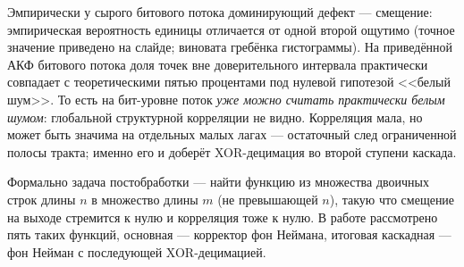 \documentclass[12pt,a4paper]{extarticle}
\begin{document}
Эмпирически у сырого битового потока доминирующий дефект --- смещение:
эмпирическая вероятность единицы отличается от одной второй ощутимо
(точное значение приведено на слайде; виновата гребёнка гистограммы).
На приведённой АКФ битового потока доля точек вне доверительного интервала
практически совпадает с теоретическими пятью процентами под нулевой
гипотезой <<белый шум>>. То есть на бит-уровне поток \emph{уже можно
считать практически белым шумом}: глобальной структурной корреляции не
видно. Корреляция мала, но может быть значима на отдельных малых лагах ---
остаточный след ограниченной полосы тракта; именно его и доберёт
XOR-децимация во второй ступени каскада.

Формально задача постобработки --- найти функцию из множества двоичных строк
длины $n$ в множество длины $m$ (не превышающей $n$), такую что смещение на
выходе стремится к нулю и корреляция тоже к нулю. В работе рассмотрено пять
таких функций, основная --- корректор фон Неймана, итоговая каскадная ---
фон Нейман с последующей XOR-децимацией.
\end{document}
